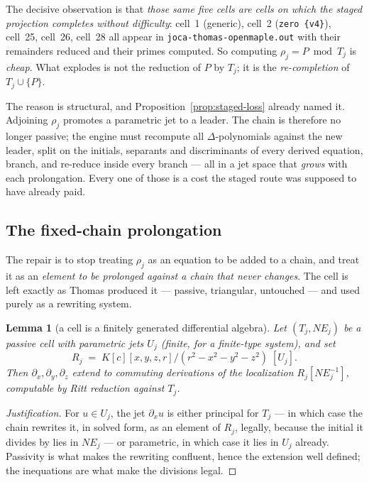 \documentclass[11pt]{article}
\newcommand{\code}[1]{\texttt{#1}}
\newtheorem{lemma}{Lemma}
\begin{document}
The decisive observation is that \emph{those same five cells are cells on
which the staged projection completes without difficulty}: cell~1 (generic),
cell~2 (\code{zero \{v4\}}), cell~25, cell~26, cell~28 all appear in
\code{joca-thomas-openmaple.out} with their remainders reduced and their
primes computed. So computing $\rho_j = P \bmod T_j$ is \emph{cheap}. What
explodes is not the reduction of $P$ by $T_j$; it is the \emph{re-completion}
of $T_j \cup \{P\}$.

The reason is structural, and Proposition~\ref{prop:staged-loss} already named
it. Adjoining $\rho_j$ promotes a parametric jet to a leader. The chain is
therefore no longer passive; the engine must recompute all $\Delta$-polynomials
against the new leader, split on the initials, separants and discriminants of
every derived equation, branch, and re-reduce inside every branch --- all in a
jet space that \emph{grows} with each prolongation. Every one of those is a
cost the staged route was supposed to have already paid.

\subsection{The fixed-chain prolongation}
\label{sec:fixed-chain}

The repair is to stop treating $\rho_j$ as an equation to be added to a chain,
and treat it as an \emph{element to be prolonged against a chain that never
changes}. The cell is left exactly as Thomas produced it --- passive,
triangular, untouched --- and used purely as a rewriting system.

\begin{lemma}[a cell is a finitely generated differential algebra]
\label{lem:cell-derivations}
Let $(T_j,NE_j)$ be a passive cell with parametric jets $U_j$ (finite, for a
finite-type system), and set
\[
  R_j \;=\; K[c][x,y,z,r]\bigl/(r^2-x^2-y^2-z^2)\;[U_j].
\]
Then $\partial_x,\partial_y,\partial_z$ extend to commuting derivations of the
localization $R_j[NE_j^{-1}]$, computable by Ritt reduction against $T_j$.
\end{lemma}

\begin{proof}[Justification]
For $u \in U_j$, the jet $\partial_x u$ is either principal for $T_j$ --- in
which case the chain rewrites it, in solved form, as an element of $R_j$,
legally, because the initial it divides by lies in $NE_j$ --- or parametric,
in which case it lies in $U_j$ already. Passivity is what makes the rewriting
confluent, hence the extension well defined; the inequations are what make
the divisions legal.
\end{proof}
\end{document}
